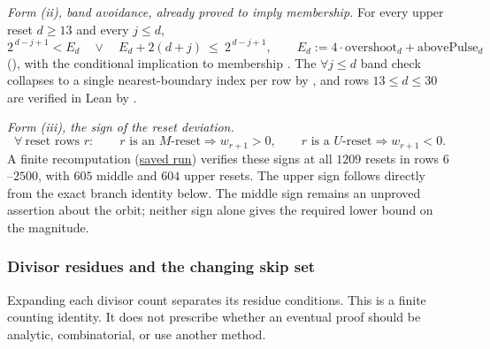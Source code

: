 \emph{Form (ii), band avoidance, already proved to imply membership.}  For every
upper reset $d\ge13$ and every $j\le d$,
\[
2^{\,d-j+1} < E_d\quad\lor\quad E_d + 2(d+j)\ \le\ 2^{\,d-j+1},
\qquad
E_d := 4\cdot\mathrm{overshoot}_d+\mathrm{abovePulse}_d
\]
(), with the
conditional implication to membership
.
The $\forall j\le d$ band check collapses to a single nearest-boundary index per row by
, and rows
$13\le d\le 30$ are verified in Lean by
.

\emph{Form (iii), the sign of the reset deviation.}
\[
\forall\ \text{reset rows } r:\qquad
r \text{ is an } M\text{-reset}\Rightarrow w_{r+1}>0,
\qquad
r \text{ is a } U\text{-reset}\Rightarrow w_{r+1}<0 .
\]
A finite recomputation (\href{https://github.com/wcook04/plectis-erdos/blob/f757115e03bebe5c04431a147da559015c680a37/research/experiments/erdos257/receipts/seam-reset-crossing-2500.json}{saved run}) verifies these signs
at all $1209$ resets in rows $6$--$2500$, with $605$ middle and $604$ upper resets.
The upper sign follows directly from the exact branch identity below.
The middle sign remains an unproved assertion about the orbit; neither
sign alone gives the required lower bound on the magnitude.

\subsubsection*{Divisor residues and the changing skip set}

Expanding each divisor count separates its residue conditions.
This is a finite counting identity.  It does not prescribe whether
an eventual proof should be analytic, combinatorial, or use another
method.

